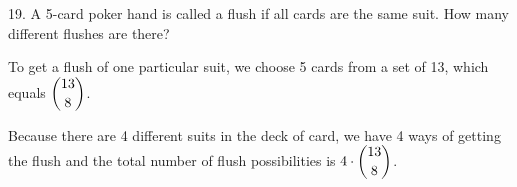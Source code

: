 \documentclass{idrisMemo}
\begin{document}
\begin{prooflist}{19. A 5-card poker hand is called a flush if all cards are the same suit. How many different flushes are there?}
\item To get a flush of one particular suit, we choose 5 cards from a set of 13,
    which equals $\dbinom{13}{8}$.
\item Because there are 4 different suits in the deck of card, we have 4 ways of
    getting the flush and the total number of flush possibilities is $4 \cdot
    \dbinom{13}{8}$.
\end{prooflist}
\end{document}
